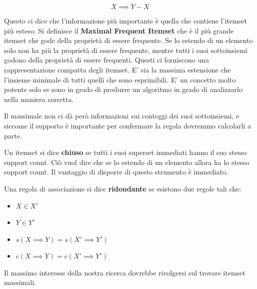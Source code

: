 \documentclass[12pt, a4paper,titlepage,openany]{article}
\begin{document}
\[ X \implies Y - X \]

Questo ci dice che l'informazione più importante è quella che contiene l'itemset più esteso. Si definisce il \textbf{Maximal Frequent Itemset} che è il più grande itemset che gode della proprietà di essere frequente. Se lo estendo di un elemento solo non ha più la proprietà di essere frequente, mentre tutti i suoi sottoinsiemi godono della proprietà di essere frequenti. Questi ci forniscono una rappresentazione compatta degli itemset. E' sia la massima estensione che l'insieme minimale di tutti quelli che sono esprimibili. E' un concetto molto potente solo se sono in grado di produrre un algoritmo in grado di analizzarlo nella maniera corretta.

Il massimale non ci dà però informazioni sui conteggi dei suoi sottoinsiemi, e siccome il supporto è importante per confermare la regola dovremmo calcolarli a parte.

Un itemset si dice \textbf{chiuso} se tutti i suoi superset immediati hanno il suo stesso support count. Ciò vuol dire che se lo estendo di un elemento allora ha lo stesso support count. Il vantaggio di disporre di questo strumento è immediato.

Una regola di associazione si dice \textbf{ridondante} se esistono due regole tali che:

\begin{itemize}
	\item $X \in X'$
	\item $Y \in Y'$
	\item $s(X \implies Y)  = s(X' \implies Y')$
	\item $c(X \implies Y)  = c(X' \implies Y')$
\end{itemize}

Il massimo interesse della nostra ricerca dovrebbe rivolgersi sul trovare itemset massimali.
\end{document}
